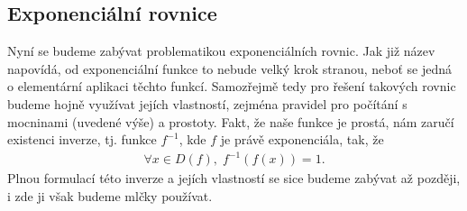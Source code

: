 \documentclass[11pt,a4paper]{article}
\begin{document}
        \subsection*{Exponenciální rovnice}
        Nyní se budeme zabývat problematikou exponenciálních rovnic. Jak již název napovídá, od exponenciální funkce to nebude velký krok stranou, neboť se jedná o elementární aplikaci těchto funkcí. Samozřejmě tedy pro řešení takových rovnic budeme hojně využívat jejích vlastností, zejména pravidel pro počítání s mocninami (uvedené výše) a prostoty. Fakt, že naše funkce je prostá, nám zaručí existenci inverze, tj. funkce $f^{-1}$, kde $f$ je právě exponenciála, tak, že
        \begin{align*}
            \forall x \in D(f), \; f^{-1}(f(x)) = 1.
        \end{align*}
        Plnou formulací této inverze a jejích vlastností se sice budeme zabývat až později, i zde ji však budeme mlčky používat.
\end{document}
